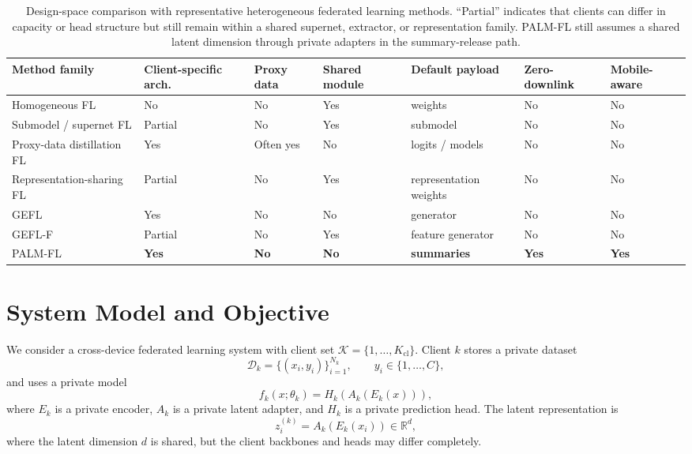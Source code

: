 \documentclass[10pt,journal]{IEEEtran}
\newcommand{\best}[1]{\textbf{#1}}
\newcommand{\R}{\mathbb{R}}
\newcommand{\nclients}{K_{\mathrm{cl}}}
\begin{document}
\begin{table}[t]
\centering
\caption{Design-space comparison with representative heterogeneous federated learning methods. ``Partial'' indicates that clients can differ in capacity or head structure but still remain within a shared supernet, extractor, or representation family. PALM-FL still assumes a shared latent dimension through private adapters in the summary-release path.}
\label{tab:prior_compare}
\begin{threeparttable}
\setlength{\tabcolsep}{4pt}
\scriptsize
\begin{tabularx}{\textwidth}{lYYYYYY}
\toprule
Method family & Client-specific arch. & Proxy data & Shared module & Default payload & Zero-downlink & Mobile-aware \\
\midrule
Homogeneous FL \cite{fedavg,fedprox,fedala} & No & No & Yes & weights & No & No \\
Submodel / supernet FL \cite{fjord,heterofl,depthfl,nefl} & Partial & No & Yes & submodel & No & No \\
Proxy-data distillation FL \cite{avgkd,feddf,fccl,fedmd,fedgh,pfedhr} & Yes & Often yes & No & logits / models & No & No \\
Representation-sharing FL \cite{lgfedavg,fml,fedclassavg,mori} & Partial & No & Yes & representation weights & No & No \\
GEFL \cite{gefl} & Yes & No & No & generator & No & No \\
GEFL-F \cite{gefl} & Partial & No & Yes & feature generator & No & No \\
PALM-FL & \best{Yes} & \best{No} & \best{No} & \best{summaries} & \best{Yes} & \best{Yes} \\
\bottomrule
\end{tabularx}
\end{threeparttable}
\end{table}

\section{System Model and Objective}
We consider a cross-device federated learning system with client set $\mathcal{K} = \{1,\dots,\nclients\}$. Client $k$ stores a private dataset
\begin{equation}
\mathcal{D}_k = \{(x_i,y_i)\}_{i=1}^{N_k}, \qquad y_i \in \{1,\dots,C\},
\end{equation}
and uses a private model
\begin{equation}
f_k(x;\theta_k) = H_k(A_k(E_k(x))),
\label{eq:model}
\end{equation}
where $E_k$ is a private encoder, $A_k$ is a private latent adapter, and $H_k$ is a private prediction head. The latent representation is
\begin{equation}
z_i^{(k)} = A_k(E_k(x_i)) \in \R^d,
\end{equation}
where the latent dimension $d$ is shared, but the client backbones and heads may differ completely.
\end{document}
